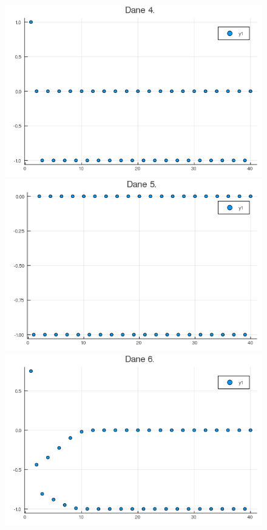 \documentclass[11pt, a4paper]{article}
\begin{document}
\begin{figure}[H]
\begin{minipage}{0.4\textwidth}
  \end{minipage}
  \begin{minipage}{0.4\textwidth}
    \centering
    \includegraphics[width=\linewidth]{plot4}
  \end{minipage}
  \begin{minipage}{0.4\textwidth}
    \centering
    \includegraphics[width=\linewidth]{plot5}
  \end{minipage}
  \begin{minipage}{0.4\textwidth}
    \centering
    \includegraphics[width=\linewidth]{plot6}

\end{minipage}
\end{figure}
\end{document}
